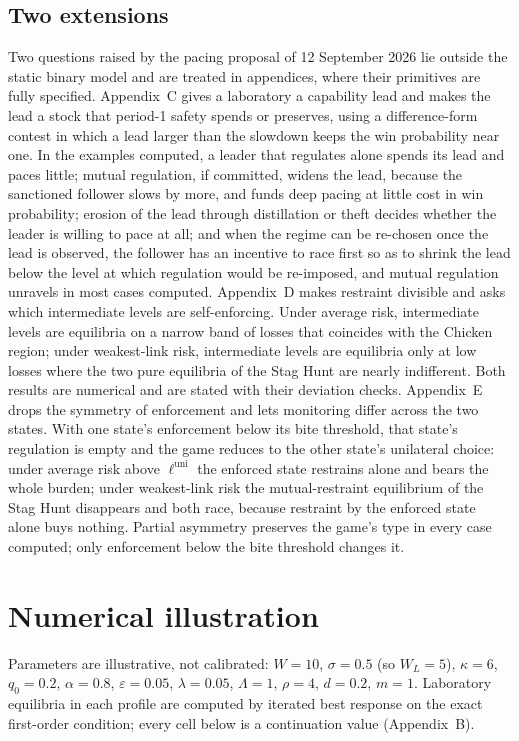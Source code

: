 \documentclass[11pt]{article}
\theoremstyle{plain}
\theoremstyle{definition}
\theoremstyle{remark}
\newcommand{\Lam}{\Lambda}
\newcommand{\WL}{W_{\!L}}
\begin{document}
\subsection{Two extensions}

Two questions raised by the pacing proposal of 12 September 2026 \citep{amodei2026} lie outside the static binary model and are treated in appendices, where their primitives are fully specified. Appendix~C gives a laboratory a capability lead and makes the lead a stock that period-1 safety spends or preserves, using a difference-form contest in which a lead larger than the slowdown keeps the win probability near one. In the examples computed, a leader that regulates alone spends its lead and paces little; mutual regulation, if committed, widens the lead, because the sanctioned follower slows by more, and funds deep pacing at little cost in win probability; erosion of the lead through distillation or theft decides whether the leader is willing to pace at all; and when the regime can be re-chosen once the lead is observed, the follower has an incentive to race first so as to shrink the lead below the level at which regulation would be re-imposed, and mutual regulation unravels in most cases computed. Appendix~D makes restraint divisible and asks which intermediate levels are self-enforcing. Under average risk, intermediate levels are equilibria on a narrow band of losses that coincides with the Chicken region; under weakest-link risk, intermediate levels are equilibria only at low losses where the two pure equilibria of the Stag Hunt are nearly indifferent. Both results are numerical and are stated with their deviation checks. Appendix~E drops the symmetry of enforcement and lets monitoring differ across the two states. With one state's enforcement below its bite threshold, that state's regulation is empty and the game reduces to the other state's unilateral choice: under average risk above $\ell^{\mathrm{uni}}$ the enforced state restrains alone and bears the whole burden; under weakest-link risk the mutual-restraint equilibrium of the Stag Hunt disappears and both race, because restraint by the enforced state alone buys nothing. Partial asymmetry preserves the game's type in every case computed; only enforcement below the bite threshold changes it.

\section{Numerical illustration}

Parameters are illustrative, not calibrated: $W=10$, $\sigma=0.5$ (so $\WL=5$), $\kappa=6$, $q_0=0.2$, $\alpha=0.8$, $\varepsilon=0.05$, $\lambda=0.05$, $\Lam=1$, $\rho=4$, $d=0.2$, $m=1$. Laboratory equilibria in each profile are computed by iterated best response on the exact first-order condition; every cell below is a continuation value (Appendix~B).
\end{document}
